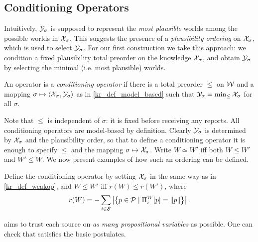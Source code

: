 \subsection{Conditioning Operators}
\label{kr_sec_conditioning_operators}

Intuitively, $\mathcal{Y}_\sigma$ is supposed to represent the \emph{most
plausible} worlds among the possible worlds in $\mathcal{X}_\sigma$. This suggests the
presence of a \emph{plausibility ordering} on $\mathcal{X}_\sigma$, which is used to
select $\mathcal{Y}_\sigma$.
%
For our first construction we take this approach: we condition a fixed
plausibility total preorder\footnotemark{} on the knowledge $\mathcal{X}_\sigma$, and
obtain $\mathcal{Y}_\sigma$ by selecting the minimal (i.e. most plausible) worlds.

\begin{definition}
\label{kr_def_conditioning_operator}
An operator is a \emph{conditioning operator} if there is a total
preorder $\le$ on $\mathcal{W}$ and a mapping $\sigma \mapsto \langle {\mathcal{X}_\sigma,
\mathcal{Y}_\sigma} \rangle$ as in \cref{kr_def_model_based} such that
$
    \mathcal{Y}_\sigma = \min_{\le}{\mathcal{X}_\sigma}
$
for all $\sigma$.
\end{definition}

Note that $\le$ is independent of $\sigma$: it is fixed before receiving any
reports. All conditioning operators are model-based by definition. Clearly
$\mathcal{Y}_\sigma$ is determined by $\mathcal{X}_\sigma$ and the plausibility order, so that to
define a conditioning operator it is enough to specify $\le$ and the mapping
$\sigma \mapsto \mathcal{X}_\sigma$.
%
Write $W \simeq W'$ iff both $W \le W'$ and $W' \le W$.
%
We now present examples of how such an ordering can be defined.

\begin{definition}
    \label{kr_def_varbasedcond}
    Define the conditioning operator \varbasedcond{} by setting
    $\mathcal{X}_\sigma$ in the same way as \weakop{} in \cref{kr_def_weakop}, and $W \le
    W'$ iff $r(W) \le r(W')$, where
    \[
        r(W) = - \sum_{i \in \mathcal{S}}\left|\left\{
            p \in \mathcal{P}
            \mid
            \Pi^W_i[p] = \|{p}\|
        \right\}\right|.
    \]
\end{definition}

\varbasedcond{} aims to trust each source on \emph{as many propositional
variables} as possible. One can check that \varbasedcond{} satisfies the
basic postulates.


